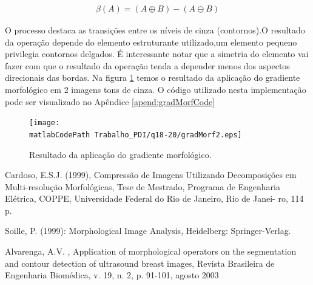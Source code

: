 \documentclass[
	article,			%
	11pt,				%
	oneside,			%
	a4paper,			%
	english,			%
	brazil,				%
	sumario=tradicional
	]{abntex2}
\newcommand{\matlabCodePath}{/home/clifte/git/Mestrado/Matlab/}
\begin{document}
\begin{align}
\beta(A) = (A \oplus B) - (A \ominus B)
\end{align}

O processo destaca as transições entre os níveis de cinza (contornos).O
resultado da operação depende do elemento estruturante utilizado,um elemento
pequeno privilegia contornos delgados.
É interessante notar que a simetria do elemento vai fazer com que o
resultado da operação tenda a depender menos dos aspectos direcionais das
bordas. Na figura \ref{fig:gradMorf} temos o resultado da aplicação do gradiente
morfológico em 2 imagens tons de cinza. O código utilizado nesta implementação
pode ser visualizado no Apêndice \ref{apend:gradMorfCode}

\begin{figure} 
		\centering 
		\texttt{[image: \\matlabCodePath
		Trabalho\_PDI/q18-20/gradMorf2.eps]}
		\caption{Resultado da aplicação do gradiente morfológico.}
		\label{fig:gradMorf}		
\end{figure}


% 


\begin{citacao}

\end{citacao}




Cardoso, E.S.J. (1999), Compressão de Imagens Utilizando
   Decomposições em Multi-resolução Morfológicas, Tese de
   Mestrado, Programa de Engenharia Elétrica, COPPE,
   Universidade Federal do Rio de Janeiro, Rio de Janei-
   ro, 114 p.
   
   Soille, P. (1999): Morphological Image Analysis, Heidelberg:
    Springer-Verlag.
   
Alvarenga, A.V. , Application of morphological operators on the
segmentation and contour detection of ultrasound breast images, Revista
Brasileira de Engenharia Biomédica, v. 19, n. 2, p. 91-101, agosto 2003


 
%
%
\end{document}
